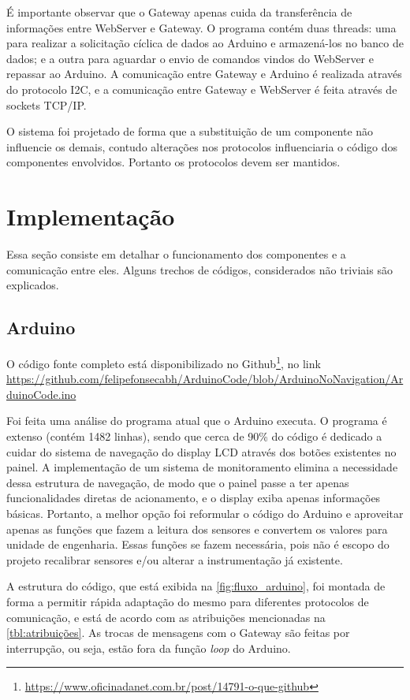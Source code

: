 			É importante observar que o Gateway apenas cuida da transferência de informações entre WebServer e Gateway. O programa contém duas threads: uma para realizar a solicitação cíclica de dados ao Arduino e armazená-los no banco de dados; e a outra para aguardar o envio de comandos vindos do WebServer e repassar ao Arduino.  A comunicação entre Gateway e Arduino é realizada através do protocolo I2C, e a comunicação entre Gateway e WebServer é feita através de sockets TCP/IP.
			
			O sistema foi projetado de forma que a substituição de um componente não influencie os demais, contudo alterações nos protocolos influenciaria o código dos componentes envolvidos. Portanto os protocolos devem ser mantidos.
			 
	\section{Implementação}
		Essa seção consiste em detalhar o funcionamento dos componentes e a comunicação entre eles. Alguns trechos de códigos, considerados não triviais são explicados.
		
		\subsection{Arduino}
			\label{Arduino}
			O código fonte completo está disponibilizado no Github\footnote{\url{https://www.oficinadanet.com.br/post/14791-o-que-github}}, no link \url{https://github.com/felipefonsecabh/ArduinoCode/blob/ArduinoNoNavigation/ArduinoCode.ino}
			
			Foi feita uma análise do programa atual que o Arduino executa. O programa é extenso (contém 1482 linhas), sendo que cerca de 90\% do código é dedicado a cuidar do sistema de navegação do display LCD através dos botões existentes no painel.  A implementação de um sistema de monitoramento elimina a necessidade dessa estrutura de navegação, de modo que o painel passe a ter apenas funcionalidades diretas de acionamento, e o display exiba apenas informações básicas. Portanto, a melhor opção foi reformular o código do Arduino e aproveitar apenas as funções que fazem a leitura dos sensores e convertem os valores para unidade de engenharia. Essas funções se fazem necessária, pois não é escopo do projeto recalibrar sensores e/ou alterar a instrumentação já existente.
				
			A estrutura do código, que está exibida na \autoref{fig:fluxo_arduino}, foi montada de forma a permitir rápida adaptação do mesmo para diferentes protocolos de comunicação, e está de acordo com as atribuições mencionadas na \autoref{tbl:atribuições}. As trocas de mensagens com o Gateway são feitas por interrupção, ou seja, estão fora da função \textit{loop} do Arduino. 
				
